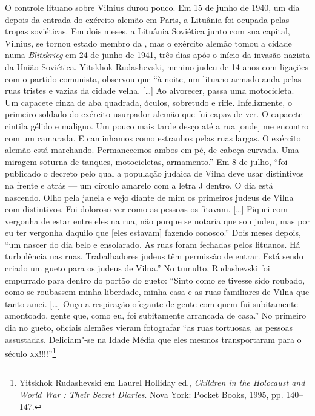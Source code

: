 O controle lituano sobre Vilnius durou pouco. Em 15 de junho de 1940, um
dia depois da entrada do exército alemão em Paris, a Lituânia foi
ocupada pelas tropas soviéticas. Em dois meses, a Lituânia Soviética
junto com sua capital, Vilnius, se tornou estado membro da , mas o
exército alemão tomou a cidade numa \textit{Blitzkrieg} em 24 de junho de
1941, três dias após o início da invasão nazista da União Soviética.
Yitskhok Rudashevski, menino judeu de 14 anos com ligações com o partido
comunista, observou que ``à noite, um lituano armado anda pelas ruas
tristes e vazias da cidade velha. [\ldots{}] Ao alvorecer, passa uma
motocicleta. Um capacete cinza de aba quadrada, óculos, sobretudo e
rifle. Infelizmente, o primeiro soldado do exército usurpador alemão que
fui capaz de ver. O capacete cintila gélido e maligno. Um pouco mais
tarde desço até a rua {[}onde{]} me encontro com um camarada. E
caminhamos como estranhos pelas ruas largas. O exército alemão está
marchando. Permanecemos ambos em pé, de cabeça curvada. Uma miragem
soturna de tanques, motocicletas, armamento.'' Em 8 de julho, ``foi
publicado o decreto pelo qual a população judaica de Vilna deve usar
distintivos na frente e atrás --- um círculo amarelo com a letra J dentro.
O dia está nascendo. Olho pela janela e vejo diante de mim os primeiros
judeus de Vilna com distintivos. Foi doloroso ver como as pessoas os
fitavam. [\ldots{}] Fiquei com vergonha de estar entre eles na rua, não
porque se notaria que sou judeu, mas por eu ter vergonha daquilo que
{[}eles estavam{]} fazendo conosco.'' Dois meses depois, ``um nascer do
dia belo e ensolarado. As ruas foram fechadas pelos lituanos. Há
turbulência nas ruas. Trabalhadores judeus têm permissão de entrar. Está
sendo criado um gueto para os judeus de Vilna.'' No tumulto, Rudashevski
foi empurrado para dentro do portão do gueto: ``Sinto como se tivesse
sido roubado, como se roubassem minha liberdade, minha casa e as ruas
familiares de Vilna que tanto amei. [\ldots{}] Ouço a respiração ofegante
de gente com quem fui subitamente amontoado, gente que, como eu, foi
subitamente arrancada de casa.'' No primeiro dia no gueto, oficiais
alemães vieram fotografar ``as ruas tortuosas, as pessoas assustadas.
Deliciam"-se na Idade Média que eles mesmos transportaram para o século
\textsc{xx}!!!!''\footnote{Yitskhok Rudashevski em Laurel Holliday ed., \textit{Children in the Holocaust and World War : Their Secret Diaries}. Nova York: Pocket Books, 1995, pp. 140--147.}

